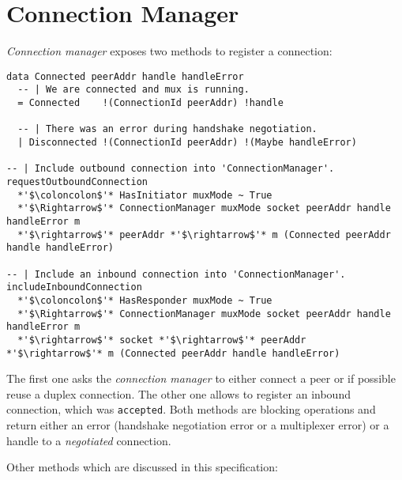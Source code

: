 \documentclass{article}
\def\connmngr{\textit{connection manager}}
\def\Connmngr{\textit{Connection manager}}
\begin{document}
\section{Connection Manager}

\Connmngr{} exposes two methods to register a connection:
\begin{lstlisting}
data Connected peerAddr handle handleError
  -- | We are connected and mux is running.
  = Connected    !(ConnectionId peerAddr) !handle

  -- | There was an error during handshake negotiation.
  | Disconnected !(ConnectionId peerAddr) !(Maybe handleError)

-- | Include outbound connection into 'ConnectionManager'.
requestOutboundConnection
  *'$\coloncolon$'* HasInitiator muxMode ~ True
  *'$\Rightarrow$'* ConnectionManager muxMode socket peerAddr handle handleError m
  *'$\rightarrow$'* peerAddr *'$\rightarrow$'* m (Connected peerAddr handle handleError)

-- | Include an inbound connection into 'ConnectionManager'.
includeInboundConnection
  *'$\coloncolon$'* HasResponder muxMode ~ True
  *'$\Rightarrow$'* ConnectionManager muxMode socket peerAddr handle handleError m
  *'$\rightarrow$'* socket *'$\rightarrow$'* peerAddr *'$\rightarrow$'* m (Connected peerAddr handle handleError)
\end{lstlisting}
The first one asks the \connmngr{} to either connect a peer or if
possible reuse a duplex connection.  The other one allows to register an
inbound connection, which was \texttt{accepted}.  Both methods are blocking
operations and return either an error (handshake negotiation error or
a multiplexer error) or a handle to a \textit{negotiated} connection.

Other methods which are discussed in this specification:
\end{document}
